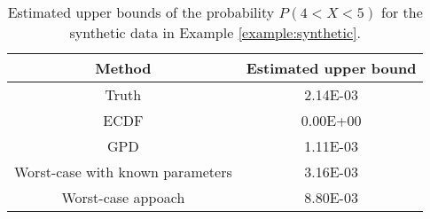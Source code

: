 \begin{table}[ht]
\centering
\begin{tabular}{cc}
  \hline
Method & Estimated upper bound \\ 
  \hline
Truth & 2.14E-03 \\ 
  ECDF & 0.00E+00 \\ 
  GPD & 1.11E-03 \\ 
  Worst-case with known parameters & 3.16E-03 \\ 
  Worst-case appoach & 8.80E-03 \\ 
   \hline
\end{tabular}
\caption{Estimated upper bounds of the probability $P(4<X<5)$ for the synthetic data in Example \ref{example:synthetic}.} 
\label{Tab:Ex SyntD}
\end{table}
